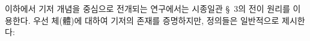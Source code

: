 
이하에서 기저 개념을 중심으로 전개되는 연구에서는 시종일관 \S\ 3의 \glqq{}전이 원리\grqq{}를 이용한다. 우선 체(體)에 대하여 기저의 존재를 증명하지만, 정의들은 일반적으로 제시한다:
